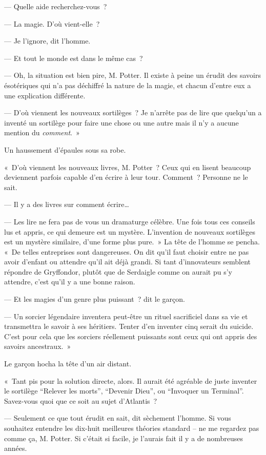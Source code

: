 --- Quelle aide recherchez-vous~?

--- La magie.
D'où vient-elle~?

--- Je l'ignore, dit l'homme.

--- Et tout le monde est dans le même cas~?

--- Oh, la situation est bien pire, M. Potter.
Il existe à peine un érudit des savoirs ésotériques qui n'a pas déchiffré la nature de la magie, et chacun d'entre eux a une explication différente.

--- D'où viennent les nouveaux sortilèges~?
Je n'arrête pas de lire que quelqu'un a inventé un sortilège pour faire une chose ou une autre mais il n'y a aucune mention du \emph{comment}.~»

Un haussement d'épaules sous sa robe.

«~D'où viennent les nouveaux livres, M. Potter~?
Ceux qui en lisent beaucoup deviennent parfois capable d'en écrire à leur tour.
Comment~?
Personne ne le sait.

--- Il y a des livres sur comment écrire…

--- Les lire ne fera pas de vous un dramaturge célèbre.
Une fois tous ces conseils lus et appris, ce qui demeure est un mystère.
L'invention de nouveaux sortilèges est un mystère similaire, d'une forme plus pure.~»
La tête de l'homme se pencha.
«~De telles entreprises sont dangereuses.
On dit qu'il faut choisir entre ne pas avoir d'enfant ou attendre qu'il ait déjà grandi.
Si tant d'innovateurs semblent répondre de Gryffondor, plutôt que de Serdaigle comme on aurait pu s'y attendre, c'est qu'il y a une bonne raison.

--- Et les magies d'un genre plus puissant~? dit le garçon.

--- Un sorcier légendaire inventera peut-être un rituel sacrificiel dans sa vie et transmettra le savoir à ses héritiers.
Tenter d'en inventer cinq serait du suicide.
C'est pour cela que les sorciers réellement puissants sont ceux qui ont appris des savoirs ancestraux.~»

Le garçon hocha la tête d'un air distant.

«~Tant pis pour la solution directe, alors.
Il aurait été agréable de juste inventer le sortilège “Relever les morts”, “Devenir Dieu”, ou “Invoquer un Terminal”.
Savez-vous quoi que ce soit au sujet d'Atlantis~?

--- Seulement ce que tout érudit en sait, dit sèchement l'homme.
Si vous souhaitez entendre les dix-huit meilleures théories standard -- ne me regardez pas comme ça, M. Potter.
Si c'était si facile, je l'aurais fait il y a de nombreuses années.

